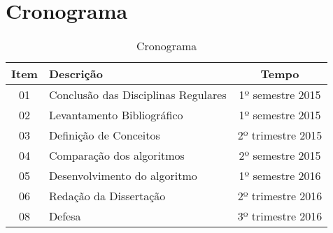 \documentclass[
	12pt,				%
	openany,			%
	twoside,			%
	a4paper,			%
	brazil,				%
	]{unimontes-ppgmsc-abntex2}
\begin{document}
\chapter{Cronograma}
\begin{table}[!htpb]
	\centering
 \begin{tabular}{|c|l|c|}
 	\hline \textbf{Item} & \textbf{Descrição} & \textbf{Tempo} \\ 
 	\hline 01 & Conclusão das Disciplinas Regulares & 1º semestre 2015 \\ 
 	\hline 02 & Levantamento Bibliográfico & 1º semestre 2015 \\ 
 	\hline 03 & Definição de Conceitos &  2º trimestre 2015\\ 
 	\hline 04 & Comparação dos algoritmos & 2º semestre 2015 \\ 
 	\hline 05 & Desenvolvimento do algoritmo & 1º semestre 2016 \\ 
 	\hline 06 & Redação da Dissertação &  2º trimestre 2016\\ 
 	\hline 08 & Defesa &  3º trimestre 2016 \\ 
 	\hline 
 \end{tabular} 
	\caption{Cronograma}
	\label{t_fixa}
\end{table}
 









\postextual

\renewcommand{\bibname}{REFER\^ENCIAS}


\printindex
\end{document}
